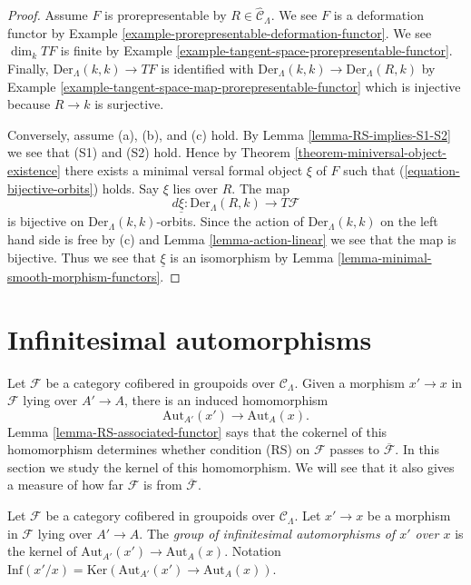 \begin{proof}
Assume $F$ is prorepresentable by $R \in \widehat{\mathcal{C}}_\Lambda$.
We see $F$ is a deformation functor by
Example \ref{example-prorepresentable-deformation-functor}.
We see $\dim_k TF$ is finite by 
Example \ref{example-tangent-space-prorepresentable-functor}.
Finally, $\text{Der}_\Lambda(k, k) \to TF$ is identified with
$\text{Der}_\Lambda(k, k) \to \text{Der}_\Lambda(R, k)$ by
Example \ref{example-tangent-space-map-prorepresentable-functor}
which is injective because $R \to k$ is surjective.

\medskip\noindent
Conversely, assume (a), (b), and (c) hold. By
Lemma \ref{lemma-RS-implies-S1-S2}
we see that (S1) and (S2) hold. Hence by
Theorem \ref{theorem-miniversal-object-existence}
there exists a minimal versal formal object $\xi$ of $F$ such that
(\ref{equation-bijective-orbits}) holds. Say $\xi$ lies over $R$.
The map
$$
d\underline{\xi} : \text{Der}_\Lambda(R, k) \to T\mathcal{F}
$$
is bijective on $\text{Der}_\Lambda(k, k)$-orbits. Since the action
of $\text{Der}_\Lambda(k, k)$ on the left hand side is free by (c) and
Lemma \ref{lemma-action-linear}
we see that the map is bijective. Thus we see that $\underline{\xi}$
is an isomorphism by
Lemma \ref{lemma-minimal-smooth-morphism-functors}.
\end{proof}




\section{Infinitesimal automorphisms}
\label{section-infinitesimal-automorphisms}

\noindent
Let $\mathcal{F}$ be a category cofibered in groupoids over
$\mathcal{C}_\Lambda$. Given a morphism $x' \to x$ in $\mathcal{F}$ lying over
$A' \to A$, there is an induced homomorphism
$$
\text{Aut}_{A'}(x') \to \text{Aut}_A(x).
$$
Lemma \ref{lemma-RS-associated-functor}
says that the cokernel of this homomorphism determines whether
condition (RS) on $\mathcal{F}$ passes to $\overline{\mathcal{F}}$.
In this section we study the kernel of this homomorphism. We will see
that it also gives a measure of how far $\mathcal{F}$ 
is from $\overline{\mathcal{F}}$.

\begin{definition}
\label{definition-relative-infinitesimal-auts}
Let $\mathcal{F}$ be a category cofibered in groupoids over $\mathcal 
C_\Lambda$. Let $x' \to x$ be a morphism in $\mathcal{F}$ lying over 
$A' \to A$. The {\it group of infinitesimal automorphisms
of $x'$ over $x$} is the kernel of
$\text{Aut}_{A'}(x') \to \text{Aut}_A(x)$.
Notation
$\text{Inf}(x'/x) = \text{Ker}(\text{Aut}_{A'}(x') \to \text{Aut}_A(x))$.
\end{definition}

